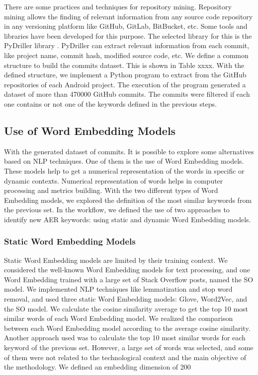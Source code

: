 There are some practices and techniques for repository mining. Repository mining allows the finding of relevant information from any source code repository in any versioning platform like GitHub, GitLab, BitBucket, etc. Some tools and libraries have been developed for this purpose. The selected library for this is the PyDriller library \cite{pydriller}.  PyDriller can extract relevant information from each commit, like project name, commit hash, modified source code, etc. We define a common structure to build the commits dataset. This is shown in Table xxxx.  With the defined structure, we implement a Python program to extract from the GitHub repositories of each Android project. The execution of the program generated a dataset of more than 470000 GitHub commits. The commits were filtered if each one contains or not one of the keywords defined in the previous steps.


\subsection{Use of Word Embedding Models}
With the generated dataset of commits. It is possible to explore some alternatives based on NLP techniques. One of them is the use of Word Embedding models. These models help to get a numerical representation of the words in specific or dynamic contexts. Numerical representation of words helps in computer processing and metrics building. With the two different types of Word Embedding models, we explored the definition of the most similar keywords from the previous set. In the workflow, we defined the use of two approaches to identify new AER keywords: using static and dynamic Word Embedding models.

\subsubsection{Static Word Embedding Models}
Static Word Embedding models are limited by their training context. We considered the well-known Word Embedding models for text processing, and one Word Embedding trained with a large set of Stack Overflow posts, named the SO model. We implemented NLP techniques like lemmatization and stop word removal, and used three static Word Embedding models: Glove, Word2Vec, and the SO model. We calculate the cosine similarity average to get the top 10 most similar words of each Word Embedding model. We realized the comparison between each Word Embedding model according to the average cosine similarity. Another approach used was to calculate the top 10 most similar words for each keyword of the previous set. However, a large set of words was selected, and some of them were not related to the technological context and the main objective of the methodology. We defined an embedding dimension of 200



